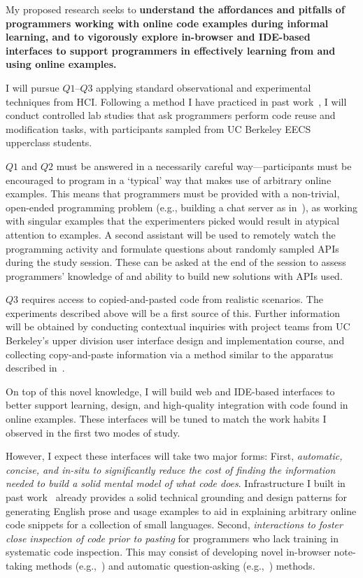 \documentclass[12pt]{memoir}
\begin{document}

My proposed research seeks to \textbf{understand the affordances and pitfalls of programmers working with online code examples during informal learning, and to vigorously explore in-browser and IDE-based interfaces to support programmers in effectively learning from and using online examples.}


I will pursue $Q1$--$Q3$ applying standard observational and experimental techniques from HCI\@.
Following a method I have practiced in past work~\cite{head_tutorons_2015}, I will conduct controlled lab studies that ask programmers perform code reuse and modification tasks, with participants sampled from UC Berkeley EECS upperclass students.

$Q1$ and $Q2$ must be answered in a necessarily careful way---participants must be encouraged to program in a `typical' way that makes use of arbitrary online examples.
This means that programmers must be provided with a non-trivial, open-ended programming problem (e.g., building a chat server as in~\cite{brandt_two_2009}), as working with singular examples that the experimenters picked would result in atypical attention to examples.
A second assistant will be used to remotely watch the programming activity and formulate questions about randomly sampled APIs during the study session.
These can be asked at the end of the session to assess programmers' knowledge of and ability to build new solutions with APIs used.

$Q3$ requires access to copied-and-pasted code from realistic scenarios.
The experiments described above will be a first source of this.
Further information will be obtained by conducting contextual inquiries with project teams from UC Berkeley's upper division user interface design and implementation course, and collecting copy-and-paste information via a method similar to the apparatus described in~\cite{kim_ethnographic_2004}.

On top of this novel knowledge, I will build web and IDE-based interfaces to better support learning, design, and high-quality integration with code found in online examples.
These interfaces will be tuned to match the work habits I observed in the first two modes of study.

However, I expect these interfaces will take two major forms:
First, \emph{automatic, concise, and in-situ to significantly reduce the cost of finding the information needed to build a solid mental model of what code does}.
Infrastructure I built in past work~\cite{head_tutorons_2015} already provides a solid technical grounding and design patterns for generating English prose and usage examples to aid in explaining arbitrary online code snippets for a collection of small languages.
Second, \emph{interactions to foster close inspection of code prior to pasting} for programmers who lack training in systematic code inspection.
This may consist of developing novel in-browser note-taking methods (e.g.,~\cite{bauer_selection-based_2007}) and automatic question-asking (e.g.,~\cite{mitkov_computer-aided_2003}) methods.
\end{document}
